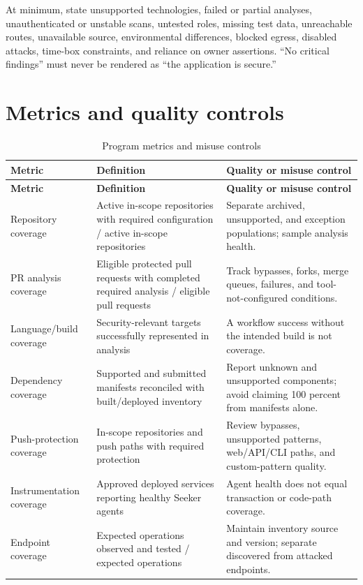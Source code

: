 \documentclass[11pt,letterpaper]{article}
\begin{document}
At minimum, state unsupported technologies, failed or partial analyses, unauthenticated or unstable scans, untested roles, missing test data, unreachable routes, unavailable source, environmental differences, blocked egress, disabled attacks, time-box constraints, and reliance on owner assertions. ``No critical findings'' must never be rendered as ``the application is secure.''

\section{Metrics and quality controls}

\begin{longtable}{@{}L{1.35in}L{1.85in}L{3.35in}@{}}
\caption{Program metrics and misuse controls}\label{tab:metrics}\\
\toprule
\textbf{Metric} & \textbf{Definition} & \textbf{Quality or misuse control} \\
\midrule
\endfirsthead
\toprule
\textbf{Metric} & \textbf{Definition} & \textbf{Quality or misuse control} \\
\midrule
\endhead
Repository coverage & Active in-scope repositories with required configuration / active in-scope repositories & Separate archived, unsupported, and exception populations; sample analysis health. \\
PR analysis coverage & Eligible protected pull requests with completed required analysis / eligible pull requests & Track bypasses, forks, merge queues, failures, and tool-not-configured conditions. \\
Language/build coverage & Security-relevant targets successfully represented in analysis & A workflow success without the intended build is not coverage. \\
Dependency coverage & Supported and submitted manifests reconciled with built/deployed inventory & Report unknown and unsupported components; avoid claiming 100 percent from manifests alone. \\
Push-protection coverage & In-scope repositories and push paths with required protection & Review bypasses, unsupported patterns, web/API/CLI paths, and custom-pattern quality. \\
Instrumentation coverage & Approved deployed services reporting healthy Seeker agents & Agent health does not equal transaction or code-path coverage. \\
Endpoint coverage & Expected operations observed and tested / expected operations & Maintain inventory source and version; separate discovered from attacked endpoints. \\

\end{longtable}
\end{document}
